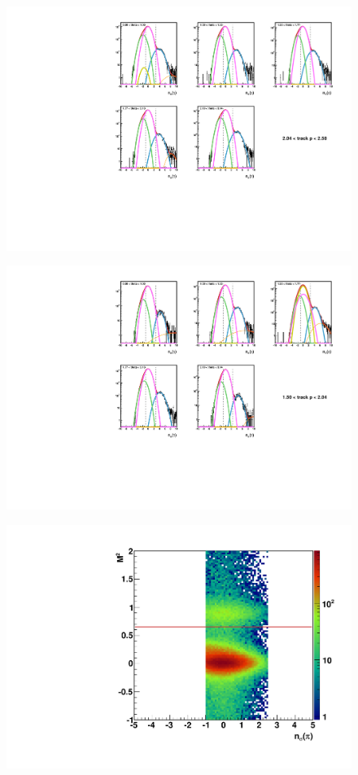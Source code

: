 \documentclass[letterpaper, abstract = on,listof=totoc, bibliography=totoc]{scrreprt}
\begin{document}
 \begin{figure}
\begin{center}
\includegraphics[width = .7\textwidth]{5gausFit_pbin_1.pdf}
\caption[]{}
\label{fig:5gaus1}
\end{center}
\end{figure}

 \begin{figure}
\begin{center}
\includegraphics[width = .7\textwidth]{5gausFit_pbin_0.pdf}
\caption[]{}
\label{fig:5gaus0}
\end{center}
\end{figure}

 \begin{figure}
\begin{center}
\includegraphics[width = .7\textwidth]{tofPlot.pdf}
\caption[]{}
\label{fig:tofPlot}
\end{center}
\end{figure}
\end{document}
